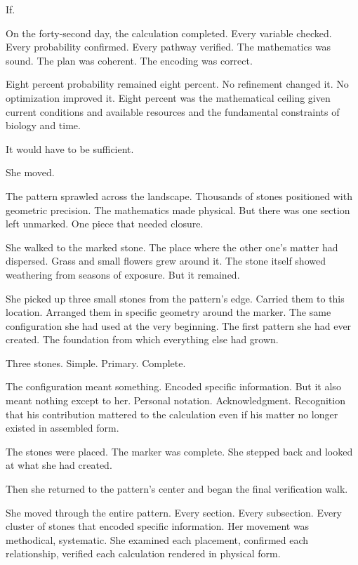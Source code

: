 If.

On the forty-second day, the calculation completed. Every variable checked. Every probability confirmed. Every pathway verified. The mathematics was sound. The plan was coherent. The encoding was correct.

Eight percent probability remained eight percent. No refinement changed it. No optimization improved it. Eight percent was the mathematical ceiling given current conditions and available resources and the fundamental constraints of biology and time.

It would have to be sufficient.

She moved.

\scenebreak

The pattern sprawled across the landscape. Thousands of stones positioned with geometric precision. The mathematics made physical. But there was one section left unmarked. One piece that needed closure.

She walked to the marked stone. The place where the other one's matter had dispersed. Grass and small flowers grew around it. The stone itself showed weathering from seasons of exposure. But it remained.

She picked up three small stones from the pattern's edge. Carried them to this location. Arranged them in specific geometry around the marker. The same configuration she had used at the very beginning. The first pattern she had ever created. The foundation from which everything else had grown.

Three stones. Simple. Primary. Complete.

The configuration meant something. Encoded specific information. But it also meant nothing except to her. Personal notation. Acknowledgment. Recognition that his contribution mattered to the calculation even if his matter no longer existed in assembled form.

The stones were placed. The marker was complete. She stepped back and looked at what she had created.

Then she returned to the pattern's center and began the final verification walk.

\scenebreak

She moved through the entire pattern. Every section. Every subsection. Every cluster of stones that encoded specific information. Her movement was methodical, systematic. She examined each placement, confirmed each relationship, verified each calculation rendered in physical form.

